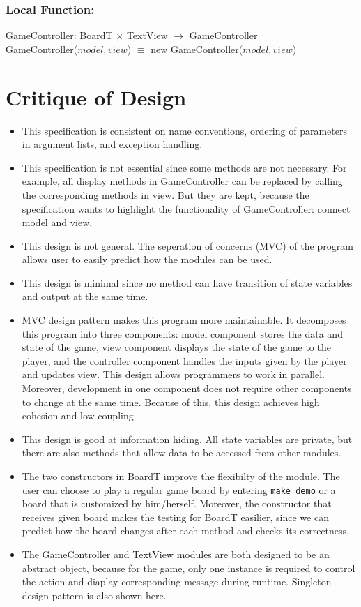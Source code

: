 \documentclass[12pt]{article}
\begin{document}
\subsubsection*{Local Function:}

GameController: BoardT $\times$ TextView $\rightarrow$ GameController \\
GameController($model, view$) $\equiv$ new GameController($model, view$)

\newpage

\section*{Critique of Design}

\begin{itemize}
\item This specification is consistent on name conventions, ordering of parameters in argument lists, and exception handling.
\item This specification is not essential since some methods are not necessary. For example, all display methods in GameController can be replaced by calling the corresponding methods in view. But they are kept, because the specification wants to highlight the functionality of GameController: connect model and view.
\item This design is not general. The seperation of concerns (MVC) of the program allows user to easily predict how the modules can be used.
\item This design is minimal since no method can have transition of state variables and output at the same time.
\item MVC design pattern makes this program more maintainable. It decomposes this program into three components: model component stores the data and state of the game, view component displays the state of the game to the player, and the controller component handles the inputs given by the player and updates view. This design allows programmers to work in parallel. Moreover, development in one component does not require other components to change at the same time. Because of this, this design achieves high cohesion and low coupling.
\item This design is good at information hiding. All state variables are private, but there are also methods that allow data to be accessed from other modules.
\item The two constructors in BoardT improve the flexibilty of the module. The user can choose to play a regular game board by entering \texttt{make demo} or a board that is customized by him/herself. Moreover, the constructor that receives given board makes the testing for BoardT easilier, since we can predict how the board changes after each method and checks its correctness.
\item The GameController and TextView modules are both designed to be an abstract object, because for the game, only one instance is required to control the action and diaplay corresponding message during runtime. Singleton design pattern is also shown here.
\end{itemize}
\end{document}
